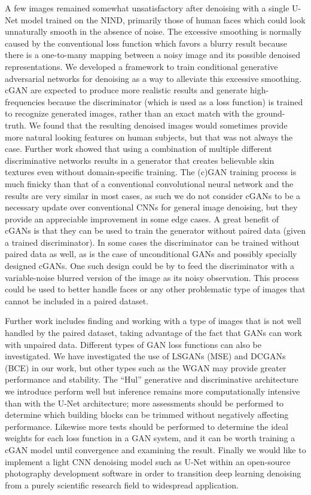 A few images remained somewhat unsatisfactory after denoising with a single U-Net model trained on the \ac{NIND}, primarily those of human faces which could look unnaturally smooth in the absence of noise. The excessive smoothing is normally caused by the conventional loss function which favors a blurry result because there is a one-to-many mapping between a noisy image and its possible denoised representations. We developed a framework to train conditional generative adversarial networks for denoising as a way to alleviate this excessive smoothing. \ac{cGAN} are expected to produce more realistic results and generate high-frequencies because the discriminator (which is used as a loss function) is trained to recognize generated images, rather than an exact match with the ground-truth. We found that the resulting denoised images would sometimes provide more natural looking features on human subjects, but that was not always the case. Further work showed that using a combination of multiple different discriminative networks results in a generator that creates believable skin textures even without domain-specific training. The (c)\ac{GAN} training process is much finicky than that of a conventional convolutional neural network and the results are very similar in most cases, as such we do not consider \acp{cGAN} to be a necessary update over conventional \acp{CNN} for general image denoising, but they provide an appreciable improvement in some edge cases. A great benefit of \acp{cGAN} is that they can be used to train the generator without paired data (given a trained discriminator). In some cases the discriminator can be trained without paired data as well, as is the case of unconditional \acp{GAN} and possibly specially designed \acp{cGAN}. One such design could be by to feed the discriminator with a variable-noise blurred version of the image as its noisy observation. This process could be used to better handle faces or any other problematic type of images that cannot be included in a paired dataset.

Further work includes finding and working with a type of images that is not well handled by the paired dataset, taking advantage of the fact that \acp{GAN} can work with unpaired data. Different types of \ac{GAN} loss functions can also be investigated. We have investigated the use of \acp{LSGAN} (\ac{MSE}) and \acp{DCGAN} (\ac{BCE}) in our work, but other types such as the \ac{WGAN} may provide greater performance and stability. The ``Hul'' generative and discriminative architecture we introduce perform well but inference remains more computationally intensive than with the U-Net architecture; more assessments should be performed to determine which building blocks can be trimmed without negatively affecting performance. Likewise more tests should be performed to determine the ideal weights for each loss function in a \ac{GAN} system, and it can be worth training a \ac{cGAN} model until convergence and examining the result. Finally we would like to implement a light \ac{CNN} denoising model such as U-Net within an open-source photography development software in order to transition deep learning denoising from a purely scientific research field to widespread application.


